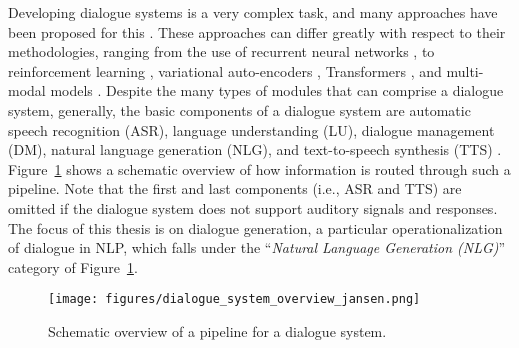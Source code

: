 Developing dialogue systems is a very complex task, and many approaches have been proposed for this \citep{mctear2020conversational}.
These approaches can differ greatly with respect to their methodologies, ranging from the use of recurrent neural networks \citep{li-etal-2016-deep}, to reinforcement learning \citep{mo2018personalizing}, variational auto-encoders \citep{ruan2019condition}, Transformers \citep{madotto-etal-2020-plug}, and multi-modal models \citep{shuster-etal-2021-multi}.
Despite the many types of modules that can comprise a dialogue system, generally, the basic components of a dialogue system are automatic speech recognition (ASR), language understanding (LU), dialogue management (DM), natural language generation (NLG), and text-to-speech synthesis (TTS) \citep{chen-etal-2017-deep}. Figure~\ref{fig:dialogue_system_overview} shows a schematic overview of how information is routed through such a pipeline. Note that the first and last components (i.e., ASR and TTS) are omitted if the dialogue system does not support auditory signals and responses. The focus of this thesis is on dialogue generation, a particular operationalization of dialogue in NLP, which falls under the ``\textit{Natural Language Generation (NLG)}'' category of Figure~\ref{fig:dialogue_system_overview}.

\begin{figure}[H]
    \centering
    \texttt{[image: figures/dialogue\_system\_overview\_jansen.png]}
    \caption{Schematic overview of a pipeline for a dialogue system.}
    \label{fig:dialogue_system_overview}
\end{figure}





